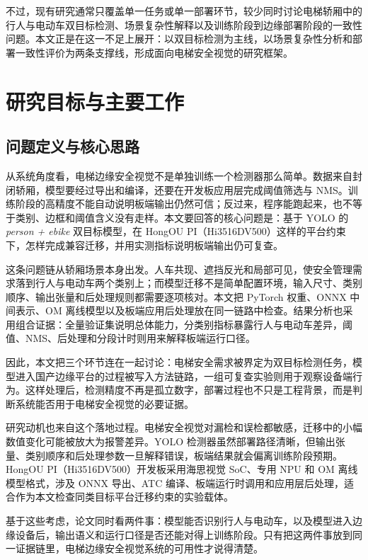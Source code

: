 不过，现有研究通常只覆盖单一任务或单一部署环节，较少同时讨论电梯轿厢中的行人与电动车双目标检测、场景复杂性解释以及训练阶段到边缘部署阶段的一致性问题。本文正是在这一不足上展开：以双目标检测为主线，以场景复杂性分析和部署一致性评价为两条支撑线，形成面向电梯安全视觉的研究框架。


\section{研究目标与主要工作}

\subsection{问题定义与核心思路}

从系统角度看，电梯边缘安全视觉不是单独训练一个检测器那么简单。数据来自封闭轿厢，模型要经过导出和编译，还要在开发板应用层完成阈值筛选与 NMS。训练阶段的高精度不能自动说明板端输出仍然可信；反过来，程序能跑起来，也不等于类别、边框和阈值含义没有走样。本文要回答的核心问题是：基于 YOLO 的 \textit{person + ebike} 双目标模型，在 HongOU PI（Hi3516DV500）这样的平台约束下，怎样完成兼容迁移，并用实测指标说明板端输出仍可复查。

这条问题链从轿厢场景本身出发。人车共现、遮挡反光和局部可见，使安全管理需求落到行人与电动车两个类别上；而模型迁移不是简单配置环境，输入尺寸、类别顺序、输出张量和后处理规则都需要逐项核对。本文把 PyTorch 权重、ONNX 中间表示、OM 离线模型以及板端应用后处理放在同一链路中检查。结果分析也采用组合证据：全量验证集说明总体能力，分类别指标暴露行人与电动车差异，阈值、NMS、后处理和分段计时则用来解释板端运行口径。

因此，本文把三个环节连在一起讨论：电梯安全需求被界定为双目标检测任务，模型进入国产边缘平台的过程被写入方法链路，一组可复查实验则用于观察设备端行为。这样处理后，检测精度不再是孤立数字，部署过程也不只是工程背景，而是判断系统能否用于电梯安全视觉的必要证据。

研究动机也来自这个落地过程。电梯安全视觉对漏检和误检都敏感，迁移中的小幅数值变化可能被放大为报警差异。YOLO 检测器虽然部署路径清晰，但输出张量、类别顺序和后处理参数一旦解释错误，板端结果就会偏离训练阶段预期。HongOU PI（Hi3516DV500）开发板采用海思视觉 SoC、专用 NPU 和 OM 离线模型格式，涉及 ONNX 导出、ATC 编译、板端运行时调用和应用层后处理，适合作为本文检查同类目标平台迁移约束的实验载体。

基于这些考虑，论文同时看两件事：模型能否识别行人与电动车，以及模型进入边缘设备后，输出语义和运行口径是否还能对得上训练阶段。只有把这两件事放到同一证据链里，电梯边缘安全视觉系统的可用性才说得清楚。

